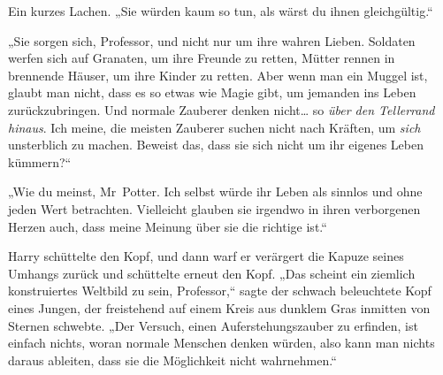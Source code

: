 Ein kurzes Lachen.
„Sie würden kaum so tun, als wärst du ihnen gleichgültig.“

„Sie sorgen sich, Professor, und nicht nur um ihre wahren Lieben. Soldaten werfen sich auf Granaten, um ihre Freunde zu retten, Mütter rennen in brennende Häuser, um ihre Kinder zu retten. Aber wenn man ein Muggel ist, glaubt man nicht, dass es so etwas wie Magie gibt, um jemanden ins Leben zurückzubringen. Und normale Zauberer denken nicht… so \emph{über den Tellerrand hinaus}. Ich meine, die meisten Zauberer suchen nicht nach Kräften, um \emph{sich} unsterblich zu machen. Beweist das, dass sie sich nicht um ihr eigenes Leben kümmern?“

„Wie du meinst, Mr~Potter. Ich selbst würde ihr Leben als sinnlos und ohne jeden Wert betrachten. Vielleicht glauben sie irgendwo in ihren verborgenen Herzen auch, dass meine Meinung über sie die richtige ist.“

Harry schüttelte den Kopf, und dann warf er verärgert die Kapuze seines Umhangs zurück und schüttelte erneut den Kopf. „Das scheint ein ziemlich konstruiertes Weltbild zu sein, Professor,“ sagte der schwach beleuchtete Kopf eines Jungen, der freistehend auf einem Kreis aus dunklem Gras inmitten von Sternen schwebte. „Der Versuch, einen Auferstehungszauber zu erfinden, ist einfach nichts, woran normale Menschen denken würden, also kann man nichts daraus ableiten, dass sie die Möglichkeit nicht wahrnehmen.“

